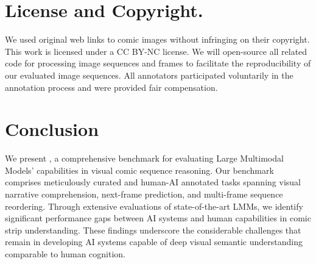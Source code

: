 \section{License and Copyright.}
We used original web links to comic images without infringing on their copyright. This work is licensed under a CC BY-NC license. We will open-source all related code for processing image sequences and frames to facilitate the reproducibility of our evaluated image sequences. All annotators participated voluntarily in the annotation process and were provided fair compensation.

\section{Conclusion}

We present \dataset{}, a comprehensive benchmark for evaluating Large Multimodal Models' capabilities in visual comic sequence reasoning. Our benchmark comprises meticulously curated and human-AI annotated tasks spanning visual narrative comprehension, next-frame prediction, and multi-frame sequence reordering. Through extensive evaluations of state-of-the-art LMMs, we identify significant performance gaps between AI systems and human capabilities in comic strip understanding.
These findings underscore the considerable challenges that remain in developing AI systems capable of deep visual semantic understanding comparable to human cognition. 

